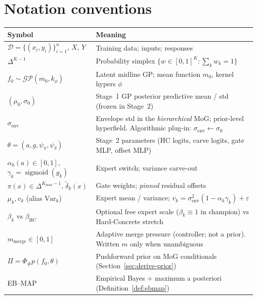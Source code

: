 \documentclass[11pt,a4paper]{article}
\theoremstyle{plain}
\theoremstyle{definition}
\theoremstyle{remark}
\newcommand{\GP}{\mathcal{GP}}
\newcommand{\D}{\mathcal{D}}
\newcommand{\tht}{\theta}
\newcommand{\sigmoid}{\operatorname{sigmoid}}
\newcommand{\Kmax}{K_{\max}}
\newcommand{\EBMAP}{EB--MAP}
\newcommand{\simplex}{\Delta}
\begin{document}
\section{Notation conventions}
\label{sec:notation}

\begin{center}
\renewcommand{\arraystretch}{1.12}
\begin{tabular}{@{}lp{10.6cm}@{}}
\toprule
Symbol & Meaning \\
\midrule
\(\D=\{(x_i,y_i)\}_{i=1}^n\), \(X\), \(Y\) &
  Training data; inputs; responses \\
\(\simplex^{K-1}\) &
  Probability simplex \(\{w\in[0,1]^K:\sum_k w_k=1\}\) \\
\(f_0\sim\GP(m_0,k_\phi)\) &
  Latent midline GP; mean function \(m_0\), kernel hypers \(\phi\) \\
\((\mu_0,\sigma_0)\) &
  Stage~1 GP posterior predictive mean / std (frozen in Stage~2) \\
\(\sigma_{\mathrm{env}}\) &
  Envelope std in the \emph{hierarchical} MoG; prior-level hyperfield.
  Algorithmic plug-in: \(\sigma_{\mathrm{env}}\leftarrow\sigma_0\) \\
\(\tht=(a,g,\psi_\pi,\psi_\delta)\) &
  Stage~2 parameters (HC logits, carve logits, gate MLP, offset MLP) \\
\(\alpha_k(a)\in[0,1]\), \(\gamma_k=\sigmoid(g_k)\) &
  Expert switch; variance carve-out \\
\(\pi(x)\in\simplex^{\Kmax-1}\), \(\tilde\delta_k(x)\) &
  Gate weights; \emph{pinned} residual offsets \\
\(\mu_k,v_k\) (alias \(\mathrm{Var}_k\)) &
  Expert mean / variance; \(v_k=\sigma_{\mathrm{env}}^2(1-\alpha_k\gamma_k)+\varepsilon\) \\
\(\beta_k\) vs \(\beta_{\mathrm{HC}}\) &
  Optional free expert scale (\(\beta_k\equiv 1\) in champion) vs Hard-Concrete stretch \\
\(m_{\mathrm{merge}}\in[0,1]\) &
  Adaptive merge pressure (controller; not a prior).
  Written \(m\) only when unambiguous \\
\(\Pi=\Phi_\# p(f_0,\tht)\) &
  Pushforward prior on MoG conditionals (Section~\ref{sec:derive-prior}) \\
\EBMAP &
  Empirical Bayes + maximum a posteriori (Definition~\ref{def:ebmap}) \\
\bottomrule
\end{tabular}
\end{center}
\end{document}
